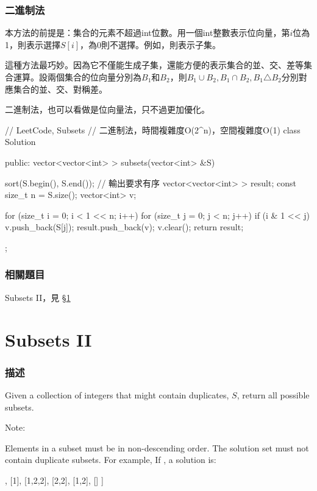 \subsubsection{二進制法}
本方法的前提是：集合的元素不超過int位數。用一個int整數表示位向量，第$i$位為1，則表示選擇$S[i]$，為0則不選擇。例如，則表示子集。

這種方法最巧妙。因為它不僅能生成子集，還能方便的表示集合的並、交、差等集合運算。設兩個集合的位向量分別為$B_1$和$B_2$，則$B_1\cup B_2, B_1 \cap B_2, B_1 \triangle B_2$分別對應集合的並、交、對稱差。

二進制法，也可以看做是位向量法，只不過更加優化。

\begin{Code}
// LeetCode, Subsets
// 二進制法，時間複雜度O(2^n)，空間複雜度O(1)
class Solution {
public:
    vector<vector<int> > subsets(vector<int> &S) {
        sort(S.begin(), S.end()); // 輸出要求有序
        vector<vector<int> > result;
        const size_t n = S.size();
        vector<int> v;

        for (size_t i = 0; i < 1 << n; i++) {
            for (size_t j = 0; j < n; j++) {
                if (i & 1 << j) v.push_back(S[j]);
            }
            result.push_back(v);
            v.clear();
        }
        return result;
    }
};
\end{Code}


\subsubsection{相關題目}
\begindot
\item Subsets II，見 \S \ref{sec:subsets-ii}
\myenddot


\section{Subsets II} %
\label{sec:subsets-ii}


\subsubsection{描述}
Given a collection of integers that might contain duplicates, $S$, return all possible subsets.

Note:

Elements in a subset must be in non-descending order.
The solution set must not contain duplicate subsets.
For example,
If , a solution is:
\begin{Code}
[
  [2],
  [1],
  [1,2,2],
  [2,2],
  [1,2],
  []
]
\end{Code}


